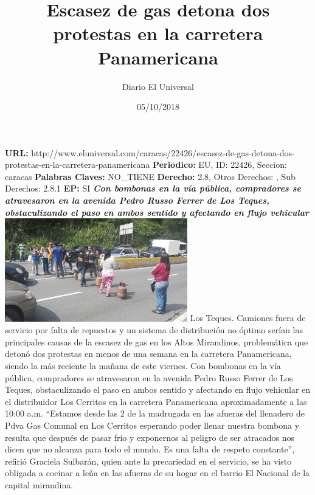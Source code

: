 \documentclass{article}%
\title{\textbf{Escasez de gas detona dos protestas en la carretera Panamericana}}%
\author{Diario El Universal}%
\date{05/10/2018}%
\begin{document}
%
\normalsize%
\maketitle%
\textbf{URL: }%
http://www.eluniversal.com/caracas/22426/escasez{-}de{-}gas{-}detona{-}dos{-}protestas{-}en{-}la{-}carretera{-}panamericana\newline%
%
\textbf{Periodico: }%
EU, %
ID: %
22426, %
Seccion: %
caracas\newline%
%
\textbf{Palabras Claves: }%
NO\_TIENE\newline%
%
\textbf{Derecho: }%
2.8, %
Otros Derechos: %
, %
Sub Derechos: %
2.8.1\newline%
%
\textbf{EP: }%
SI\newline%
\newline%
%
\textbf{\textit{Con bombonas en la vía pública, compradores se atravesaron en la avenida Pedro Russo Ferrer de Los Teques, obstaculizando el paso en ambos sentido y afectando en flujo vehicular}}%
\newline%
\newline%
%
\includegraphics[width=300px]{236.jpg}%
\newline%
%
Los Teques.  Camiones fuera de servicio por falta de repuestos y un sistema de distribución no óptimo serían las principales causas de la escasez de gas en los Altos Mirandinos, problemática que detonó dos protestas en menos de una semana en la carretera Panamericana, siendo la más reciente la mañana de este viernes.%
\newline%
%
Con bombonas en la vía pública, compradores se atravesaron en la avenida Pedro Russo Ferrer de Los Teques, obstaculizando el paso en ambos sentido y afectando en flujo vehicular en el distribuidor Los Cerritos en la carretera Panamericana aproximadamente a las 10:00 a.m.%
\newline%
%
“Estamos desde las 2 de la madrugada en las afueras del llenadero de Pdva Gas Comunal en Los Cerritos  esperando poder llenar nuestra bombona y resulta que después de pasar frío y exponernos al peligro de ser atracados nos dicen que no alcanza para todo el mundo. Es una falta de respeto constante”, refirió Graciela Sulbarán, quien ante la precariedad en el servicio, se ha visto obligada a cocinar a leña en las afueras de su hogar en el barrio El Nacional de la capital mirandina.%
\end{document}
